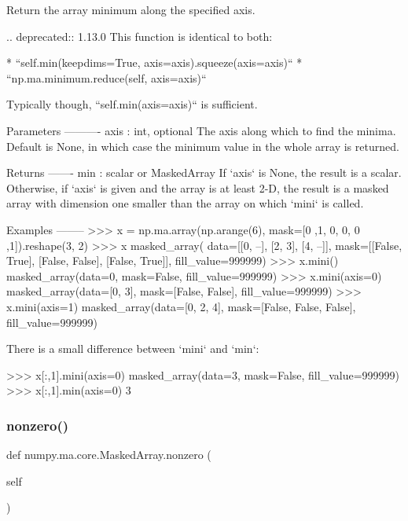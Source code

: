 \begin{DoxyVerb}Return the array minimum along the specified axis.

.. deprecated:: 1.13.0
   This function is identical to both:

    * ``self.min(keepdims=True, axis=axis).squeeze(axis=axis)``
    * ``np.ma.minimum.reduce(self, axis=axis)``

   Typically though, ``self.min(axis=axis)`` is sufficient.

Parameters
----------
axis : int, optional
    The axis along which to find the minima. Default is None, in which case
    the minimum value in the whole array is returned.

Returns
-------
min : scalar or MaskedArray
    If `axis` is None, the result is a scalar. Otherwise, if `axis` is
    given and the array is at least 2-D, the result is a masked array with
    dimension one smaller than the array on which `mini` is called.

Examples
--------
>>> x = np.ma.array(np.arange(6), mask=[0 ,1, 0, 0, 0 ,1]).reshape(3, 2)
>>> x
masked_array(
  data=[[0, --],
[2, 3],
[4, --]],
  mask=[[False,  True],
[False, False],
[False,  True]],
  fill_value=999999)
>>> x.mini()
masked_array(data=0,
     mask=False,
       fill_value=999999)
>>> x.mini(axis=0)
masked_array(data=[0, 3],
     mask=[False, False],
       fill_value=999999)
>>> x.mini(axis=1)
masked_array(data=[0, 2, 4],
     mask=[False, False, False],
       fill_value=999999)

There is a small difference between `mini` and `min`:

>>> x[:,1].mini(axis=0)
masked_array(data=3,
     mask=False,
       fill_value=999999)
>>> x[:,1].min(axis=0)
3
\end{DoxyVerb}
 \mbox{\label{classnumpy_1_1ma_1_1core_1_1MaskedArray_a2e48ff55563cd2b57b8183bd8192d062}} 
\subsubsection{\texorpdfstring{nonzero()}{nonzero()}}
{\footnotesize\ttfamily def numpy.\+ma.\+core.\+Masked\+Array.\+nonzero (\begin{DoxyParamCaption}\item[{}]{self }\end{DoxyParamCaption})}

